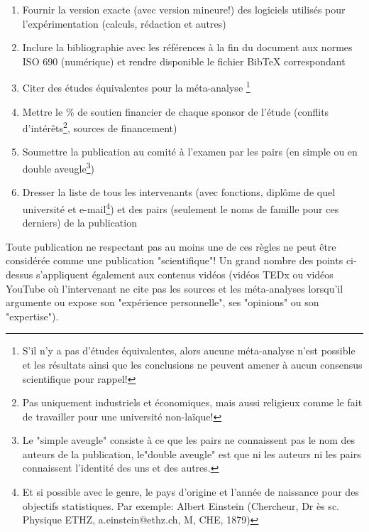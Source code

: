 \begin{enumerate}[label=\protect\circledbullet{\arabic*},leftmargin=15mm]
		\item Fournir la version exacte (avec version mineure!) des logiciels utilis\'es pour l'expérimentation (calculs, r\'edaction et autres)
		
		\item Inclure la bibliographie avec les r\'ef\'erences à la fin du document aux normes ISO 690 (numérique) et rendre disponible le fichier BibTeX correspondant
		
		\item Citer des \'etudes \'equivalentes pour la m\'eta-analyse \footnote{S'il n'y a pas d'\'etudes \'equivalentes, alors aucune m\'eta-analyse n'est possible et les r\'esultats ainsi que les conclusions ne peuvent amener à aucun consensus scientifique pour rappel!}
		
		\item Mettre le \% de soutien financier de chaque sponsor de l'\'etude (conflits d'int\'erêts\footnote{Pas uniquement industriels et \'economiques, mais aussi religieux comme le fait de travailler pour une universit\'e non-laïque!}, sources de financement)
		
		\item Soumettre la publication au comit\'e à l'examen par les pairs (en simple ou en double aveugle\footnote{Le "simple aveugle" consiste à ce que les pairs ne connaissent pas le nom des auteurs de la publication, le"double aveugle" est que ni les auteurs ni les pairs connaissent l'identit\'e des uns et des autres.})
		
		\item Dresser la liste de tous les intervenants (avec fonctions, diplôme de quel universit\'e et e-mail\footnote{Et si possible avec le genre, le pays d'origine et l'ann\'ee de naissance pour des objectifs statistiques. Par exemple: Albert Einstein (Chercheur, Dr ès sc. Physique ETHZ, a.einstein@ethz.ch, M, CHE, 1879)}) et des pairs (seulement le noms de famille pour ces derniers) de la publication
	\end{enumerate}
	Toute publication ne respectant pas au moins une de ces règles ne peut être consid\'er\'ee comme une publication "scientifique"! Un grand nombre des points ci-dessus s'appliquent \'egalement aux contenus vid\'eos (vid\'eos TEDx ou vid\'eos YouTube où l'intervenant ne cite pas les sources et les m\'eta-analyses lorsqu'il argumente ou expose son "exp\'erience personnelle", ses "opinions" ou son "expertise").
	
